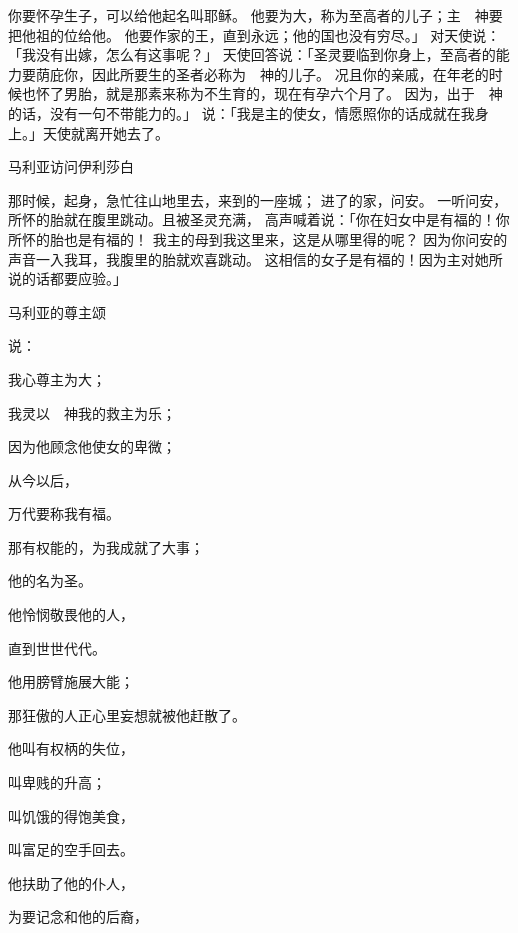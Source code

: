 {你要怀孕生子，可以给他起名叫耶稣。
他要为大，称为至高者的儿子；主　神要把他祖{}的位给他。
他要作{}家的王，直到永远；他的国也没有穷尽。」
对天使说：「我没有出嫁，怎么有这事呢？」
天使回答说：「圣灵要临到你身上，至高者的能力要荫庇你，因此所要生的圣者必称为　神的儿子。
况且你的亲戚{}，在年老的时候也怀了男胎，就是那素来称为不生育的，现在有孕六个月了。
因为，出于　神的话，没有一句不带能力的。」
说：「我是主的使女，情愿照你的话成就在我身上。」天使就离开她去了。
\par }{\SH 马利亚访问伊利莎白
\par }{\PP {}那时候，{}起身，急忙往山地里去，来到{}的一座城；
进了{}的家，问{}安。
一听{}问安，所怀的胎就在腹里跳动。{}且被圣灵充满，
高声喊着说：「你在妇女中是有福的！你所怀的胎也是有福的！
我主的母到我这里来，这是从哪里得的呢？
因为你问安的声音一入我耳，我腹里的胎就欢喜跳动。
这相信的女子是有福的！因为主对她所说的话都要应验。」
\par }{\SH 马利亚的尊主颂
\par }{\PP {}说：
\par }{\Q 我心尊主为大；
\par }{\Q {}我灵以　神我的救主为乐；
\par }{\Q {}因为他顾念他使女的卑微；
\par }{\Q 从今以后，
\par }{\Q 万代要称我有福。
\par }{\Q {}那有权能的，为我成就了大事；
\par }{\Q 他的名为圣。
\par }{\Q {}他怜悯敬畏他的人，
\par }{\Q 直到世世代代。
\par }{\Q {}他用膀臂施展大能；
\par }{\Q 那狂傲的人正心里妄想就被他赶散了。
\par }{\Q {}他叫有权柄的失位，
\par }{\Q 叫卑贱的升高；
\par }{\Q {}叫饥饿的得饱美食，
\par }{\Q 叫富足的空手回去。
\par }{\Q {}他扶助了他的仆人{}，
\par }{\Q {}为要记念{}和他的后裔，
}
